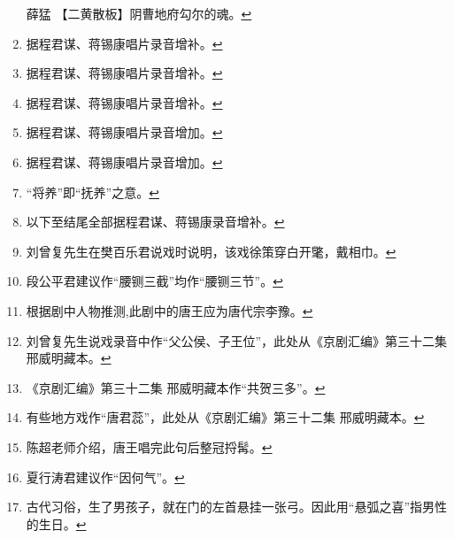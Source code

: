 \begin{enumerate}
  薛猛 【二黄散板】阴曹地府勾尔的魂。\protect\hyperlink{fnref371}{↩}
\item
  \leavevmode\hypertarget{fn372}{}%
  据程君谋、蒋锡康唱片录音增补。\protect\hyperlink{fnref372}{↩}
\item
  \leavevmode\hypertarget{fn373}{}%
  据程君谋、蒋锡康唱片录音增补。\protect\hyperlink{fnref373}{↩}
\item
  \leavevmode\hypertarget{fn374}{}%
  据程君谋、蒋锡康唱片录音增补。\protect\hyperlink{fnref374}{↩}
\item
  \leavevmode\hypertarget{fn375}{}%
  据程君谋、蒋锡康唱片录音增加。\protect\hyperlink{fnref375}{↩}
\item
  \leavevmode\hypertarget{fn376}{}%
  据程君谋、蒋锡康唱片录音增加。\protect\hyperlink{fnref376}{↩}
\item
  \leavevmode\hypertarget{fn377}{}%
  ``将养''即``抚养''之意。\protect\hyperlink{fnref377}{↩}
\item
  \leavevmode\hypertarget{fn378}{}%
  以下至结尾全部据程君谋、蒋锡康录音增补。\protect\hyperlink{fnref378}{↩}
\item
  \leavevmode\hypertarget{fn379}{}%
  刘曾复先生在樊百乐君说戏时说明，该戏徐策穿白开氅，戴相巾。\protect\hyperlink{fnref379}{↩}
\item
  \leavevmode\hypertarget{fn380}{}%
  段公平君建议作``腰铡三截''均作``腰铡三节''。\protect\hyperlink{fnref380}{↩}
\item
  \leavevmode\hypertarget{fn381}{}%
  根据剧中人物推测,此剧中的唐王应为唐代宗李豫。\protect\hyperlink{fnref381}{↩}
\item
  \leavevmode\hypertarget{fn382}{}%
  刘曾复先生说戏录音中作``父公侯、子王位''，此处从《京剧汇编》第三十二集
  邢威明藏本。\protect\hyperlink{fnref382}{↩}
\item
  \leavevmode\hypertarget{fn383}{}%
  《京剧汇编》第三十二集
  邢威明藏本作``共贺三多''。\protect\hyperlink{fnref383}{↩}
\item
  \leavevmode\hypertarget{fn384}{}%
  有些地方戏作``唐君蕊''，此处从《京剧汇编》第三十二集
  邢威明藏本。\protect\hyperlink{fnref384}{↩}
\item
  \leavevmode\hypertarget{fn385}{}%
  陈超老师介绍，唐王唱完此句后整冠捋髯。\protect\hyperlink{fnref385}{↩}
\item
  \leavevmode\hypertarget{fn386}{}%
  夏行涛君建议作``因何气''。\protect\hyperlink{fnref386}{↩}
\item
  \leavevmode\hypertarget{fn387}{}%
  古代习俗，生了男孩子，就在门的左首悬挂一张弓。因此用``悬弧之喜''指男性的生日。\protect\hyperlink{fnref387}{↩}

\end{enumerate}
